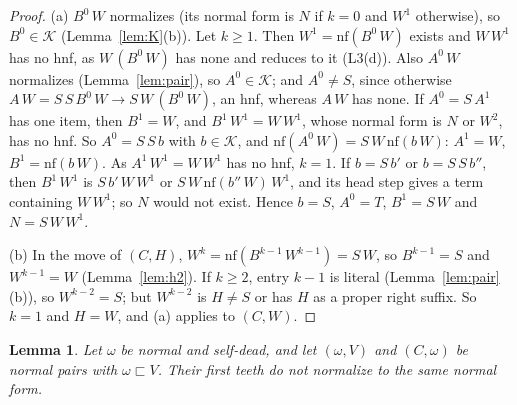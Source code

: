 \documentclass[11pt]{amsart}
\newtheorem{lemma}[theorem]{Lemma}
\theoremstyle{definition}
\newcommand{\nf}{\mathrm{nf}}
\newcommand{\Kc}{\mathcal K}
\newcommand{\psq}{\sqsubset}
\begin{document}
\begin{proof}
(a) $B^0\,W$ normalizes (its normal form is $N$ if $k=0$ and $W^1$ otherwise), so $B^0\in\Kc$
(Lemma~\ref{lem:K}(b)). Let $k\ge1$. Then $W^1=\nf(B^0\,W)$ exists and $W\,W^1$ has no hnf, as
$W\,(B^0\,W)$ has none and reduces to it (L3(d)). Also $A^0\,W$ normalizes
(Lemma~\ref{lem:pair}), so $A^0\in\Kc$; and $A^0\ne S$, since otherwise
$A\,W=S\,S\,B^0\,W\to S\,W\,(B^0\,W)$, an hnf, whereas $A\,W$ has none.
If $A^0=S\,A^1$ has one item, then $B^1=W$, and $B^1\,W^1=W\,W^1$, whose normal form is $N$ or
$W^2$, has no hnf. So $A^0=S\,S\,b$ with $b\in\Kc$, and $\nf(A^0\,W)=S\,W\,\nf(b\,W)$: $A^1=W$,
$B^1=\nf(b\,W)$. As $A^1\,W^1=W\,W^1$ has no hnf, $k=1$. If $b=S\,b'$ or $b=S\,S\,b''$, then
$B^1\,W^1$ is $S\,b'\,W\,W^1$ or $S\,W\,\nf(b''\,W)\,W^1$, and its head step gives a term
containing $W\,W^1$; so $N$ would not exist. Hence $b=S$, $A^0=T$, $B^1=S\,W$ and $N=S\,W\,W^1$.

(b) In the move of $(C,H)$, $W^k=\nf(B^{k-1}\,W^{k-1})=S\,W$, so $B^{k-1}=S$ and $W^{k-1}=W$
(Lemma~\ref{lem:h2}). If $k\ge2$, entry $k-1$ is literal (Lemma~\ref{lem:pair}(b)), so
$W^{k-2}=S$; but $W^{k-2}$ is $H\ne S$ or has $H$ as a proper right suffix. So $k=1$ and $H=W$, and
(a) applies to $(C,W)$.
\end{proof}

\begin{lemma}\label{lem:alpha}
Let $\omega$ be normal and self-dead, and let $(\omega,V)$ and $(C,\omega)$ be normal pairs with
$\omega\psq V$. Their first teeth do not normalize to the same normal form.
\end{lemma}
\end{document}
